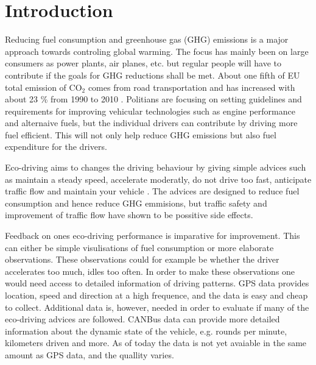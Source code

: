 \section{Introduction}

Reducing fuel consumption and greenhouse gas (GHG) emissions is a major approach towards controling global warming. 
The focus has mainly been on large consumers as power plants, air planes, etc. but regular people will have to contribute if the goals for GHG reductions shall be met. %
About one fifth of EU total emission of CO$_2$ comes from road transportation and has increased with about 23 \% from 1990 to 2010 \cite{RoadTransport}.
Politians are focusing on setting guidelines and requirements for improving vehicular technologies such as engine performance and alternaive fuels, but the individual drivers can contribute by driving more fuel efficient.
This will not only help reduce GHG emissions but also fuel expenditure for the drivers. 

Eco-driving aims to changes the driving behaviour by giving simple advices such as maintain a steady speed, accelerate moderatly, do not drive too fast, anticipate traffic flow and maintain your vehicle \cite{EcodrivingAdvice,KorGront}.
The advices are designed to reduce fuel consumption and hence reduce GHG emmisions, but traffic safety and improvement of traffic flow have shown to be possitive side effects.

Feedback on ones eco-driving performance is imparative for improvement. 
This can either be simple visulisations of fuel consumption or more elaborate observations.
These observations could for example be whether the driver accelerates too much, idles too often. 
In order to make these observations one would need access to detailed information of driving patterns. 
GPS data provides location, speed and direction at a high frequence, and the data is easy and cheap to collect.
Additional data is, however, needed in order to evaluate if many of the eco-driving advices are followed.
CANBus data can provide more detailed information about the dynamic state of the vehicle, e.g. rounds per minute, kilometers driven and more.
As of today the data is not yet avaiable in the same amount as GPS data, and the quallity varies. %


